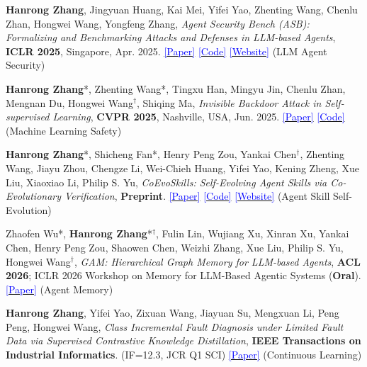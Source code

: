 \documentclass[letterpaper,11pt]{article}
\newcommand{\catg}[1]{{\footnotesize\textcolor{tagcolor}{#1}}}
\begin{document}
\begin{enumerate}[itemsep=5pt, topsep=5pt, parsep=1pt, leftmargin=*, label={[\arabic*]}]
    \item \small{\textbf{Hanrong Zhang}, Jingyuan Huang, Kai Mei, Yifei Yao, Zhenting Wang, Chenlu Zhan, Hongwei Wang, Yongfeng Zhang, \textit{Agent Security Bench (ASB): Formalizing and Benchmarking Attacks and Defenses in LLM-based Agents}, \textbf{ICLR 2025}, Singapore, Apr. 2025. \href{https://arxiv.org/abs/2410.02644}{\textcolor{blue}{[Paper]}} \href{https://github.com/agiresearch/ASB}{\textcolor{blue}{[Code]}} \href{https://luckfort.github.io/ASBench/}{\textcolor{blue}{[Website]}} \catg{(LLM Agent Security)}
    }
    \item \small{\textbf{Hanrong Zhang}*, Zhenting Wang*, Tingxu Han, Mingyu Jin, Chenlu Zhan, Mengnan Du, Hongwei Wang$^\dagger$, Shiqing Ma, \textit{Invisible Backdoor Attack in Self-supervised Learning}, \textbf{CVPR 2025}, Nashville, USA, Jun. 2025. \href{https://arxiv.org/abs/2405.14672}{\textcolor{blue}{[Paper]}} \href{https://github.com/Zhang-Henry/INACTIVE}{\textcolor{blue}{[Code]}} \catg{(Machine Learning Safety)}
    }
    \item \small{\textbf{Hanrong Zhang}*, Shicheng Fan*, Henry Peng Zou, Yankai Chen$^\dagger$, Zhenting Wang, Jiayu Zhou, Chengze Li, Wei-Chieh Huang, Yifei Yao, Kening Zheng, Xue Liu, Xiaoxiao Li, Philip S. Yu, \textit{CoEvoSkills: Self-Evolving Agent Skills via Co-Evolutionary Verification}, \textbf{Preprint}. \href{https://arxiv.org/abs/2604.01687}{\textcolor{blue}{[Paper]}} \href{https://github.com/Zhang-Henry/CoEvoSkills}{\textcolor{blue}{[Code]}} \href{https://zhang-henry.github.io/CoEvoSkills/}{\textcolor{blue}{[Website]}} \catg{(Agent Skill Self-Evolution)}}
    \item \small{Zhaofen Wu*, \textbf{Hanrong Zhang}*$^\dagger$, Fulin Lin, Wujiang Xu, Xinran Xu, Yankai Chen, Henry Peng Zou, Shaowen Chen, Weizhi Zhang, Xue Liu, Philip S. Yu, Hongwei Wang$^\dagger$, \textit{GAM: Hierarchical Graph Memory for LLM-based Agents}, \textbf{ACL 2026}; ICLR 2026 Workshop on Memory for LLM-Based Agentic Systems (\textbf{Oral}). \href{https://arxiv.org/abs/2604.12285}{\textcolor{blue}{[Paper]}} \catg{(Agent Memory)}}
    \item \small{\textbf{Hanrong Zhang}, Yifei Yao, Zixuan Wang, Jiayuan Su, Mengxuan Li, Peng Peng, Hongwei Wang, \textit{Class Incremental Fault Diagnosis under Limited Fault Data via Supervised Contrastive Knowledge Distillation}, \textbf{IEEE Transactions on Industrial Informatics}. (IF=12.3, JCR Q1 SCI) \href{https://arxiv.org/pdf/2501.09525}{\textcolor{blue}{[Paper]}} \catg{(Continuous Learning)}}

\end{enumerate}
\end{document}
